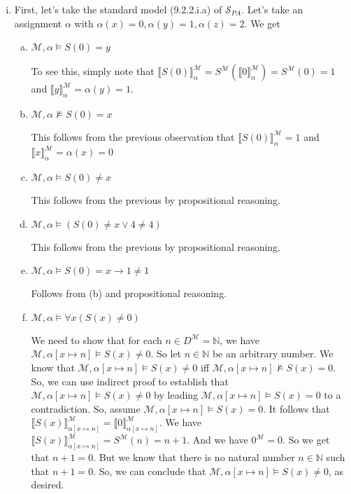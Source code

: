 \begin{enumerate}[\thesection.1]
\begin{enumerate}[(i)]
			\item First, let's take the standard model (9.2.2.i.a) of $\mathcal{S}_{PA}$. Let's take an assignment $\alpha$ with $\alpha(x)=0, \alpha(y)=1, \alpha(z)=2$. We get
			
			\begin{enumerate}[(a)]
			
				\item $\mathcal{M},\alpha\vDash S(0)=y$
				
				To see this, simply note that $\llbracket S(0)\rrbracket^\mathcal{M}_\alpha=S^\mathcal{M}(\llbracket 0\rrbracket^\mathcal{M}_\alpha)=S^\mathcal{M}(0)=1$ and $\llbracket y\rrbracket^\mathcal{M}_\alpha=\alpha(y)=1$.
				
				\item $\mathcal{M},\alpha\nvDash S(0)=x$
				
				This follows from the previous observation that $\llbracket S(0)\rrbracket^\mathcal{M}_\alpha=1$ and $\llbracket x\rrbracket^\mathcal{M}_\alpha=\alpha(x)=0$
				
				\item $\mathcal{M},\alpha\vDash S(0)\neq x$
				
				This follows from the previous by propositional reasoning.
				
				\item $\mathcal{M},\alpha\vDash (S(0)\neq x\lor 4\neq 4)$
				
					This follows from the previous by propositional reasoning.
					
				\item $\mathcal{M},\alpha\vDash S(0)=x\to 1\neq 1$
				
				Follows from (b) and propositional reasoning.
					
				\item $\mathcal{M},\alpha\vDash\forall x(S(x)\neq 0)$

				We need to show that for each  $n\in D^\mathcal{M}=\mathbb{N}$, we have $\mathcal{M},\alpha[x\mapsto n]\vDash S(x)\neq 0$. So let $n\in \mathbb{N}$ be an arbitrary number. We know that  $\mathcal{M},\alpha[x\mapsto n]\vDash S(x)\neq 0$ iff $\mathcal{M},\alpha[x\mapsto n]\nvDash S(x)=0$. So, we can use indirect proof to establish that $\mathcal{M},\alpha[x\mapsto n]\vDash S(x)\neq 0$ by leading $\mathcal{M},\alpha[x\mapsto n]\vDash S(x)=0$ to a contradiction. So, assume $\mathcal{M},\alpha[x\mapsto n]\vDash S(x)=0$. It follows that $\llbracket S(x)\rrbracket^\mathcal{M}_{\alpha[x\mapsto n]}=\llbracket0\rrbracket^\mathcal{M}_{\alpha[x\mapsto n]}$. We have $\llbracket S(x)\rrbracket^\mathcal{M}_{\alpha[x\mapsto n]}=S^\mathcal{M}(n)=n+1$. And we have $0^\mathcal{M}=0$. So we get that $n+1=0$. But we know that there is no natural number $n\in\mathbb{N}$ such that $n+1=0$. So, we can conclude that $\mathcal{M},\alpha[x\mapsto n]\vDash S(x)\neq 0$, as desired.
				

\end{enumerate}
\end{enumerate}
\end{enumerate}
